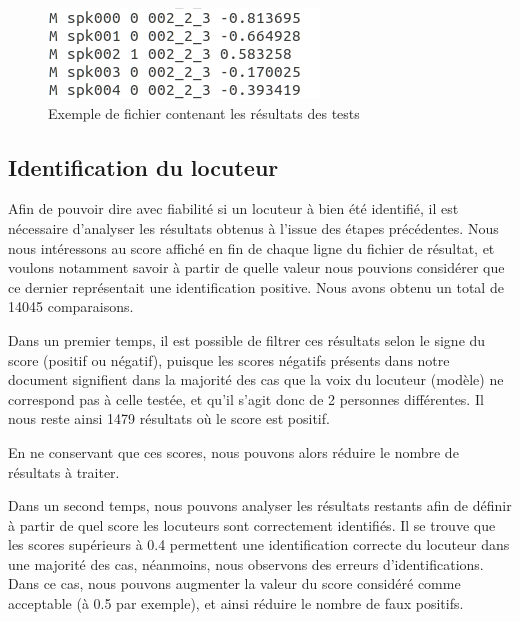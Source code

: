 \documentclass[a4paper, 12pt]{book}
\begin{document}
\begin{figure}[htbp]
  \centering
  \includegraphics[width=0.5\linewidth]{images/goodResultExample.png}
  \caption{Exemple de fichier contenant les résultats des tests}
\end{figure}
 

\subsection{Identification du locuteur}

Afin de pouvoir dire avec fiabilité si un locuteur à bien été identifié, il est nécessaire d'analyser les résultats obtenus à l'issue des étapes précédentes. Nous nous intéressons au score affiché en fin de chaque ligne du fichier de résultat, et voulons notamment savoir à partir de quelle valeur nous pouvions considérer que ce dernier représentait une identification positive. Nous avons obtenu un total de 14045 comparaisons.

Dans un premier temps, il est possible de filtrer ces résultats selon le signe du score (positif ou négatif), puisque les scores négatifs présents dans notre document signifient dans la majorité des cas que la voix du locuteur (modèle) ne correspond pas à celle testée, et qu'il s'agit donc de 2 personnes différentes. Il nous reste ainsi 1479 résultats où le score est positif.

En ne conservant que ces scores, nous pouvons alors réduire le nombre de résultats à traiter.

Dans un second temps, nous pouvons analyser les résultats restants afin de définir à partir de quel score les locuteurs sont correctement identifiés. Il se trouve que les scores supérieurs à 0.4 permettent une identification correcte du locuteur dans une majorité des cas, néanmoins, nous observons des erreurs d'identifications. Dans ce cas, nous pouvons augmenter la valeur du score considéré comme acceptable (à 0.5 par exemple), et ainsi réduire le nombre de faux positifs.
\end{document}
